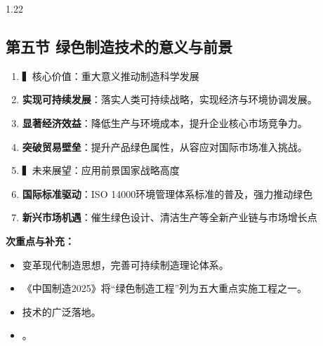 \documentclass[12pt,a4paper]{article}
\begin{document}
\begin{spacing}{1.22}
\subsection{第五节 绿色制造技术的意义与前景}
\begin{tcolorbox}[colback=yellow!6,colframe=red!55!black,title=重点,left=1mm,right=1mm]
\begin{enumerate}[leftmargin=2.2em,label=\arabic*.]
  \item ▍核心价值：重大意义推动制造科学发展
  \item \textbf{实现可持续发展}：落实人类可持续战略，实现经济与环境协调发展。
  \item \textbf{显著经济效益}：降低生产与环境成本，提升企业核心市场竞争力。
  \item \textbf{突破贸易壁垒}：提升产品绿色属性，从容应对国际市场准入挑战。
  \item ▍未来展望：应用前景国家战略高度
  \item \textbf{国际标准驱动}：ISO 14000环境管理体系标准的普及，强力推动绿色
  \item \textbf{新兴市场机遇}：催生绿色设计、清洁生产等全新产业链与市场增长点
\end{enumerate}
\end{tcolorbox}
\noindent\textbf{次重点与补充：}
\begin{itemize}[leftmargin=2.2em,label=--]
  \item 变革现代制造思想，完善可持续制造理论体系。
  \item 《中国制造2025》将“绿色制造工程”列为五大重点实施工程之一。
  \item 技术的广泛落地。
  \item 。
\end{itemize}

\end{spacing}
\end{document}
